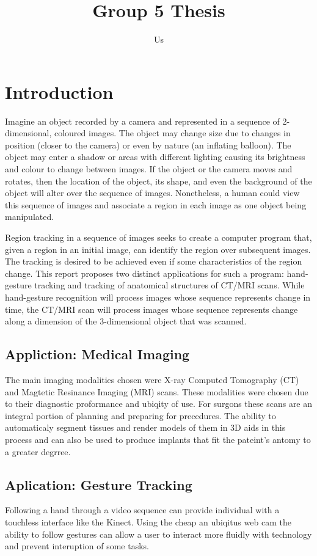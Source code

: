 \documentclass{article}
\title{Group 5 Thesis}
\author{Us}
\begin{document}
	\maketitle

	\section{Introduction}
		Imagine an object recorded by a camera and represented in a sequence of 2-dimensional, coloured images. The object may change size due to changes in position (closer to the camera) or even by nature (an inflating balloon). The object may enter a shadow or areas with different lighting causing its brightness and colour to change between images. If the object or the camera moves and rotates, then the location of the object, its shape, and even the background of the object will alter over the sequence of images. Nonetheless, a human could view this sequence of images and associate a region in each image as one object being manipulated. 

		Region tracking in a sequence of images seeks to create a computer program that, given a region in an initial image, can identify the region over subsequent images. The tracking is desired to be achieved even if some characteristics of the region change. This report proposes two distinct applications for such a program: hand-gesture tracking and tracking of anatomical structures of CT/MRI scans. While hand-gesture recognition will process images whose sequence represents change in time, the CT/MRI scan will process images whose sequence represents change along a dimension of the 3-dimensional object that was scanned.

		\subsection{Appliction: Medical Imaging}
			The main imaging modalities chosen were X-ray Computed Tomography (CT) and Magtetic Resinance Imaging (MRI) scans. These modalities were chosen due to their diagnostic proformance and ubiqity of use. For surgons these scans are an integral portion of planning and preparing for precedures. The ability to automaticaly segment tissues and render models of them in 3D aids in this process and can also be used to produce implants that fit the pateint's antomy to a greater degrree.


		\subsection{Aplication: Gesture Tracking}
			Following a hand through a video sequence can provide individual with a touchless interface like the Kinect. Using the cheap an ubiqitus web cam the ability to follow gestures can allow a user to interact more fluidly with technology and prevent interuption of some tasks.
\end{document}
